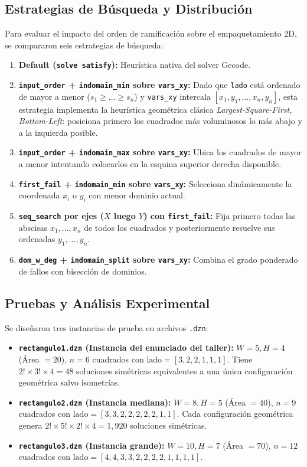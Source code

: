 \subsection{Estrategias de Búsqueda y Distribución}
Para evaluar el impacto del orden de ramificación sobre el empaquetamiento 2D, se compararon seis estrategias de búsqueda:
\begin{enumerate}
    \item \textbf{Default (\texttt{solve satisfy}):} Heurística nativa del solver Gecode.
    \item \textbf{\texttt{input\_order} + \texttt{indomain\_min} sobre \texttt{vars\_xy}:} Dado que \texttt{lado} está ordenado de mayor a menor ($s_1 \ge \dots \ge s_n$) y \texttt{vars\_xy} intercala $[x_1, y_1, \dots, x_n, y_n]$, esta estrategia implementa la heurística geométrica clásica \textit{Largest-Square-First, Bottom-Left}: posiciona primero los cuadrados más voluminosos lo más abajo y a la izquierda posible.
    \item \textbf{\texttt{input\_order} + \texttt{indomain\_max} sobre \texttt{vars\_xy}:} Ubica los cuadrados de mayor a menor intentando colocarlos en la esquina superior derecha disponible.
    \item \textbf{\texttt{first\_fail} + \texttt{indomain\_min} sobre \texttt{vars\_xy}:} Selecciona dinámicamente la coordenada $x_i$ o $y_i$ con menor dominio actual.
    \item \textbf{\texttt{seq\_search} por ejes ($X$ luego $Y$) con \texttt{first\_fail}:} Fija primero todas las abscisas $x_1, \dots, x_n$ de todos los cuadrados y posteriormente resuelve sus ordenadas $y_1, \dots, y_n$.
    \item \textbf{\texttt{dom\_w\_deg} + \texttt{indomain\_split} sobre \texttt{vars\_xy}:} Combina el grado ponderado de fallos con bisección de dominios.
\end{enumerate}

\subsection{Pruebas y Análisis Experimental}
Se diseñaron tres instancias de prueba en archivos \texttt{.dzn}:
\begin{itemize}
    \item \textbf{\texttt{rectangulo1.dzn} (Instancia del enunciado del taller):} $W = 5, H = 4$ (Área $= 20$), $n = 6$ cuadrados con $\text{lado} = [3, 2, 2, 1, 1, 1]$. Tiene $2! \times 3! \times 4 = 48$ soluciones simétricas equivalentes a una única configuración geométrica salvo isometrías.
    \item \textbf{\texttt{rectangulo2.dzn} (Instancia mediana):} $W = 8, H = 5$ (Área $= 40$), $n = 9$ cuadrados con $\text{lado} = [3, 3, 2, 2, 2, 2, 2, 1, 1]$. Cada configuración geométrica genera $2! \times 5! \times 2! \times 4 = 1{,}920$ soluciones simétricas.
    \item \textbf{\texttt{rectangulo3.dzn} (Instancia grande):} $W = 10, H = 7$ (Área $= 70$), $n = 12$ cuadrados con $\text{lado} = [4, 4, 3, 3, 2, 2, 2, 2, 1, 1, 1, 1]$.
\end{itemize}

